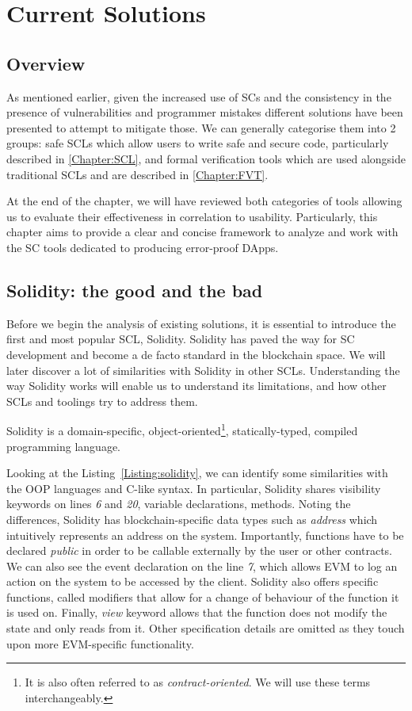 \documentclass[oneside]{ecsproject}     %
\newcommand{\lref}[1]{Listing~\ref{#1}}
\begin{document}
\chapter{Current Solutions}

\section{Overview}

As mentioned earlier, given the increased use of SCs and the consistency in the presence of vulnerabilities and programmer mistakes
different solutions have been presented to attempt to mitigate those. 
We can generally categorise them into 2 groups: safe SCLs which allow users to write safe and secure code, particularly described in \cref{Chapter:SCL}, 
and formal verification tools which are used alongside traditional SCLs and are described in \cref{Chapter:FVT}.

At the end of the chapter, we will have reviewed both categories of tools allowing us to evaluate their effectiveness in correlation to usability.
Particularly, this chapter aims to provide a clear and concise framework to analyze and work with the SC tools dedicated to producing
error-proof DApps. 

\section{Solidity: the good and the bad}

Before we begin the analysis of existing solutions, it is essential to introduce the first and most popular SCL, Solidity\cite{sc_survey}\cite{solidity_docs}.
Solidity has paved the way for SC development and become a de facto standard in the blockchain space. We will later discover a lot of similarities with Solidity in other SCLs.
Understanding the way Solidity works will enable us to understand its limitations, and how other SCLs and toolings try to address them.

Solidity is a domain-specific, object-oriented\footnote{It is also often referred to as \textit{contract-oriented}. We will use these terms interchangeably.}, statically-typed, compiled
programming language\cite{solidity_docs}.

Looking at the \lref{Listing:solidity}, we can identify some similarities with the OOP languages and C-like syntax.
In particular, Solidity shares visibility keywords on lines \textit{6} and \textit{20}, variable declarations, methods.
Noting the differences, Solidity has blockchain-specific data types such as \textit{address} which intuitively represents an address on the system.
Importantly, functions have to be declared \textit{public} in order to be callable externally by the user or other contracts.
We can also see the event declaration on the line \textit{7}, which allows EVM to log an action on the system to be accessed by the client.
Solidity also offers specific functions, called modifiers that allow for a change of behaviour of the function it is used on\cite{solidity_docs}.
Finally, \textit{view} keyword allows that the function does not modify the state and only reads from it.
Other specification details are omitted as they touch upon more EVM-specific functionality.
\end{document}

